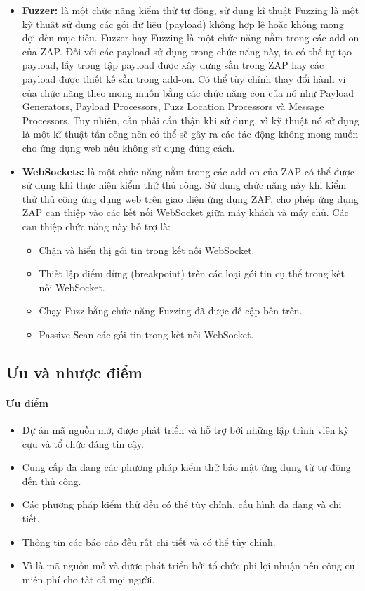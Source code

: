 \begin{itemize}
  \item \textbf{Fuzzer:} là một chức năng kiểm thử tự động, sử dụng kĩ thuật Fuzzing là một kỹ thuật sử dụng các gói dữ liệu (payload) không hợp lệ hoặc không mong đợi đến mục tiêu. Fuzzer hay Fuzzing là một chức năng nằm trong các add-on của ZAP. Đối với các payload sử dụng trong chức năng này, ta có thể tự tạo payload, lấy trong tập payload được xây dựng sẵn trong ZAP hay các payload được thiết kế sẵn trong add-on. Có thể tùy chỉnh thay đổi hành vi của chức năng theo mong muốn bằng các chức năng con của nó như Payload Generators, Payload Processors, Fuzz Location Processors và Message Processors. Tuy nhiên, cần phải cẩn thận khi sử dụng, vì kỹ thuật nó sử dụng là một kĩ thuật tấn công nên có thể sẽ gây ra các tác động không mong muốn cho ứng dụng web nếu không sử dụng đúng cách.
  \item \textbf{WebSockets:} là một chức năng nằm trong các add-on của ZAP có thể được sử dụng khi thực hiện kiểm thử thủ công. Sử dụng chức năng này khi kiểm thử thủ công ứng dụng web trên giao diện ứng dụng ZAP, cho phép ứng dụng ZAP can thiệp vào các kết nối WebSocket giữa máy khách và máy chủ. Các can thiệp chức năng này hỗ trợ là:
        \begin{itemize}
          \item Chặn và hiển thị gói tin trong kết nối WebSocket.
          \item Thiết lập điểm dừng (breakpoint) trên các loại gói tin cụ thể trong kết nối WebSocket.
          \item Chạy Fuzz bằng chức năng Fuzzing đã được đề cập bên trên.
          \item Passive Scan các gói tin trong kết nối WebSocket.
        \end{itemize}
\end{itemize}

\subsection{Ưu và nhược điểm}

\paragraph{Ưu điểm}
\begin{itemize}
  \item Dự án mã nguồn mở, được phát triển và hỗ trợ bởi những lập trình viên kỳ cựu và tổ chức đáng tin cậy.
  \item Cung cấp đa dạng các phương pháp kiểm thử bảo mật ứng dụng từ tự động đến thủ công.
  \item Các phương pháp kiểm thử đều có thể tùy chỉnh, cấu hình đa dạng và chi tiết.
  \item Thông tin các báo cáo đều rất chi tiết và có thể tùy chỉnh.
  \item Vì là mã nguồn mở và được phát triển bởi tổ chức phi lợi nhuận nên công cụ miễn phí cho tất cả mọi người.
\end{itemize}

